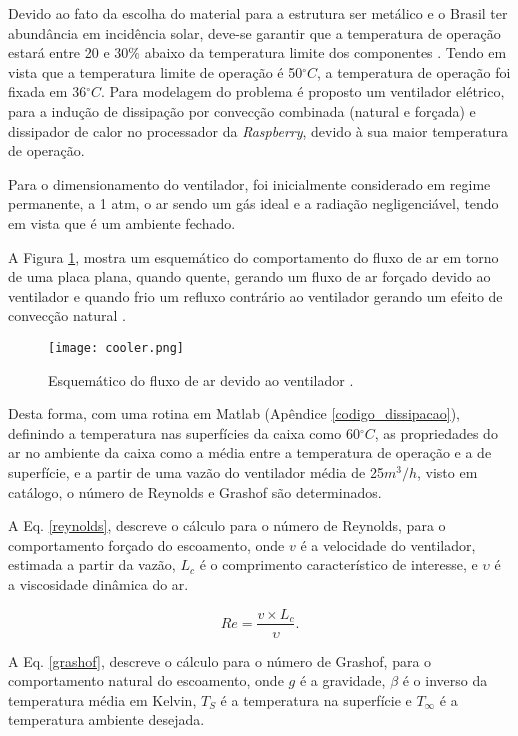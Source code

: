 Devido ao fato da escolha do material para a estrutura ser metálico e o Brasil ter abundância em incidência solar, deve-se garantir que a temperatura de operação estará entre 20 e $30\%$ abaixo da temperatura limite dos componentes \cite{temperatura}. Tendo em vista que a temperatura limite de operação é 50$^{\circ}C$, a temperatura de operação foi fixada em 36$^{\circ}C$. Para modelagem do problema é proposto um ventilador elétrico, para a indução de dissipação por convecção combinada (natural e forçada) e dissipador de calor no processador da \textit{Raspberry}, devido à sua maior temperatura de operação.

Para o dimensionamento do ventilador, foi inicialmente considerado em regime permanente, a 1 atm, o ar sendo um gás ideal e a radiação negligenciável, tendo em vista que é um ambiente fechado.

A Figura \ref{cooler}, mostra um esquemático do comportamento do fluxo de ar em torno de uma placa plana, quando quente, gerando um fluxo de ar forçado devido ao ventilador e quando frio um refluxo contrário ao ventilador gerando um efeito de convecção natural \cite{livro_transcal}.

\begin{figure}[h]
	\centering
    \texttt{[image: cooler.png]}
    \caption{Esquemático do fluxo de ar devido ao ventilador \cite{livro_transcal}.}
    \label{cooler}
\end{figure}

Desta forma, com uma rotina em Matlab (Apêndice \ref{codigo_dissipacao}), definindo a temperatura nas superfícies da caixa como 60$^{\circ}C$, as propriedades do ar no ambiente da caixa como a média entre a temperatura de operação e a de superfície, e a partir de uma vazão do ventilador média de 25$m^3/h$, visto em catálogo, o número de Reynolds e Grashof são determinados. 

A Eq. \ref{reynolds}, descreve o cálculo para o número de Reynolds, para o comportamento forçado do escoamento, onde $v$ é a velocidade do ventilador, estimada a partir da vazão, $L_c$ é o comprimento característico de interesse, e $\upsilon$ é a viscosidade dinâmica do ar.

\begin{equation}
	Re= \frac{v \times L_c}{\upsilon}.
	\label{reynolds}
\end{equation}

A Eq. \ref{grashof}, descreve o cálculo para o número de Grashof, para o comportamento natural do escoamento, onde $g$ é a gravidade, $\beta$ é o inverso da temperatura média em Kelvin, $T_S$ é a temperatura na superfície e $T_{\infty}$ é a temperatura ambiente desejada.

